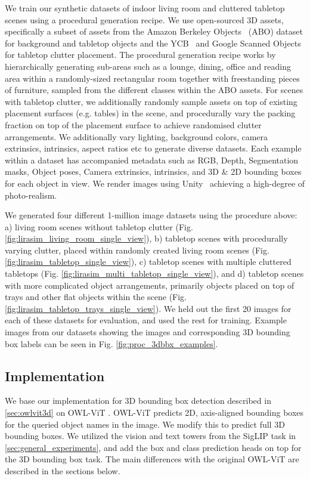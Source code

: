 We train our synthetic datasets of indoor living room and cluttered tabletop scenes using a procedural generation recipe. We use open-sourced 3D assets, specifically a subset of assets from the Amazon Berkeley Objects~\citep{collins2022abo} (ABO) dataset for background and tabletop objects and the YCB~\citep{calli2015benchmarking} and Google Scanned Objects~\citep{downs2022google} for tabletop clutter placement. The procedural generation recipe works by hierarchically generating sub-areas such as a lounge, dining, office and reading area within a randomly-sized rectangular room together with freestanding pieces of furniture, sampled from the different classes within the ABO assets. For scenes with tabletop clutter, we additionally randomly sample assets on top of existing placement surfaces (e.g. tables) in the scene, and procedurally vary the packing fraction on top of the placement surface to achieve randomised clutter arrangements. We additionally vary lighting, background colors, camera extrinsics, intrinsics, aspect ratios etc to generate diverse datasets. Each example within a dataset has accompanied metadata such as RGB, Depth, Segmentation masks, Object poses, Camera extrinsics, intrinsics, and 3D \& 2D bounding boxes for each object in view. We render images using Unity~\citep{unity} achieving a high-degree of photo-realism.

We generated four different 1-million image datasets using the procedure above: a) living room scenes without tabletop clutter (Fig. \ref{fig:lirasim_living_room_single_view}), b) tabletop scenes with procedurally varying clutter, placed within randomly created living room scenes (Fig. \ref{fig:lirasim_tabletop_single_view}), c) tabletop scenes with multiple cluttered tabletops (Fig. \ref{fig:lirasim_multi_tabletop_single_view}), and d) tabletop scenes with more complicated object arrangements, primarily objects placed on top of trays and other flat objects within the scene (Fig. \ref{fig:lirasim_tabletop_trays_single_view}). We held out the first 20 images for each of these datasets for evaluation, and used the rest for training. Example images from our datasets showing the images and corresponding 3D bounding box labels can be seen in Fig. \ref{fig:proc_3dbbx_examples}.


\subsection{Implementation}

We base our implementation for 3D bounding box detection described in \cref{sec:owlvit3d} on OWL-ViT \citep{minderer2022simple}.
OWL-ViT predicts 2D, axis-aligned bounding boxes for the queried object names in the image.
We modify this to predict full 3D bounding boxes.
We utilized the vision and text towers from the SigLIP task in \cref{sec:general_experiments}, and add the box and class prediction heads on top for the 3D bounding box task.
The main differences with the original OWL-ViT are described in the sections below.

